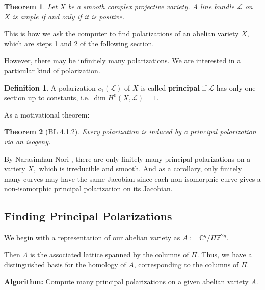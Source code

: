 \documentclass[12pt,reqno]{amsart}
\newcommand{\C}{\mathbb{C}}
\newcommand{\Z}{\mathbb{Z}}
\newcommand{\mc}{\mathcal}
\newtheorem*{thm*}{Theorem}
\theoremstyle{definition}
\newtheorem{defn}{Definition}
\theoremstyle{remark}
\begin{document}
\begin{thm*} 
Let $X$ be a smooth complex projective variety. A line bundle $\mc{L}$ on $X$ is ample if and only if it is positive.
\end{thm*}


This is how we ask the computer to find polarizations of an abelian variety $X$, which are steps 1 and 2 of the following section.

However, there may be infinitely many polarizations. We are interested in a particular kind of polarization.

\begin{defn}  A polarization $c_1(\mc{L})$ of $X$ is called \textbf{principal} if $\mc{L}$ has only one section up to constants, i.e. $\dim H^0(X, \mc{L}) = 1$.  \end{defn} 

As a motivational theorem:

\begin{thm*} [BL 4.1.2] Every polarization is induced by a principal polarization via an isogeny. \end{thm*}

By Narasimhan-Nori \cite{nn}, there are only finitely many principal polarizations on a variety $X,$ which is irreducible and smooth. And as a corollary, only finitely many curves may have the same Jacobian since each non-isomorphic curve gives a non-isomorphic principal polarization on its Jacobian.


\subsection{Finding Principal Polarizations} 
\label{sec:find}
We begin with a representation of our abelian variety as $A := \C^g/\Pi\Z^{2g}$. 

Then $\Lambda$ is the associated lattice spanned by the columns of $\Pi$. Thus, we have a distinguished basis for the homology of $A$, corresponding to the columns of $\Pi$. 

\vspace{+5pt}

\textbf{Algorithm:} Compute many principal polarizations on a given abelian variety $A$.
\end{document}
